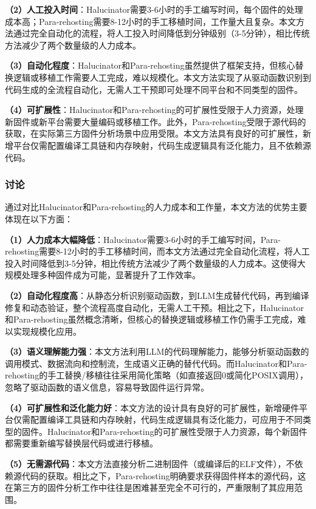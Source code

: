 \textbf{（2）人工投入时间}：Halucinator需要3-6小时的手工编写时间，每个固件的处理成本高；Para-rehosting需要8-12小时的手工移植时间，工作量大且复杂。本文方法通过完全自动化的流程，将人工投入时间降低到分钟级别（3-5分钟），相比传统方法减少了两个数量级的人力成本。

\textbf{（3）自动化程度}：Halucinator和Para-rehosting虽然提供了框架支持，但核心替换逻辑或移植工作需要人工完成，难以规模化。本文方法实现了从驱动函数识别到代码生成的全流程自动化，无需人工干预即可处理不同平台和不同类型的固件。

\textbf{（4）可扩展性}：Halucinator和Para-rehosting的可扩展性受限于人力资源，处理新固件或新平台需要大量编码或移植工作。此外，Para-rehosting受限于源代码的获取，在实际第三方固件分析场景中应用受限。本文方法具有良好的可扩展性，新增平台仅需配置编译工具链和内存映射，代码生成逻辑具有泛化能力，且不依赖源代码。

\subsubsection{讨论}
  
通过对比Halucinator和Para-rehosting的人力成本和工作量，本文方法的优势主要体现在以下方面：

\textbf{（1）人力成本大幅降低}：Halucinator需要3-6小时的手工编写时间，Para-rehosting需要8-12小时的手工移植时间，而本文方法通过完全自动化流程，将人工投入时间降低到3-5分钟，相比传统方法减少了两个数量级的人力成本。这使得大规模处理多种固件成为可能，显著提升了工作效率。

\textbf{（2）自动化程度高}：从静态分析识别驱动函数，到LLM生成替代代码，再到编译修复和动态验证，整个流程高度自动化，无需人工干预。相比之下，Halucinator和Para-rehosting虽然概念清晰，但核心的替换逻辑或移植工作仍需手工完成，难以实现规模化应用。

\textbf{（3）语义理解能力强}：本文方法利用LLM的代码理解能力，能够分析驱动函数的调用模式、数据流向和控制流，生成语义正确的替代代码。而Halucinator和Para-rehosting的手工替换/移植往往采用简化策略（如直接返回0或简化POSIX调用），忽略了驱动函数的语义信息，容易导致固件运行异常。

\textbf{（4）可扩展性和泛化能力好}：本文方法的设计具有良好的可扩展性，新增硬件平台仅需配置编译工具链和内存映射，代码生成逻辑具有泛化能力，可应用于不同类型的固件。Halucinator和Para-rehosting的可扩展性受限于人力资源，每个新固件都需要重新编写替换层代码或进行移植。

\textbf{（5）无需源代码}：本文方法直接分析二进制固件（或编译后的ELF文件），不依赖源代码的获取。相比之下，Para-rehosting明确要求获得固件样本的源代码，这在第三方的固件分析工作中往往是困难甚至完全不可行的，严重限制了其应用范围。

